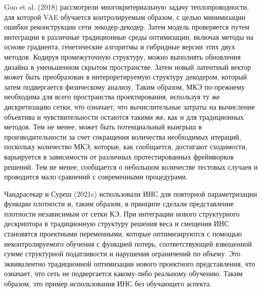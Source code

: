Guo et al. (2018) рассмотрели многокритериальную задачу теплопроводности, для которой VAE обучается контролируемым образом, с целью минимизации ошибки реконструкции сети энкодер-декодер. Затем модель проверяется путем интеграции в различные традиционные среды оптимизации, включая методы на основе градиента, генетические алгоритмы и гибридные версии этих двух методов. Кодируя промежуточную структуру, можно выполнять обновления дизайна в уменьшенном скрытом пространстве. Затем новый латентный вектор может быть преобразован в интерпретируемую структуру декодером, который затем подвергается физическому анализу. Таким образом, МКЭ по-прежнему необходима для всего пространства проектирования, используя ту же дискретизацию сетки, что означает, что вычислительные затраты на вычисление объектива и чувствительности остаются такими же, как и для традиционных методов. Тем не менее, может быть потенциальный выигрыш в производительности за счет сокращения количества необходимых итераций, поскольку количество МКЭ, которые, как сообщается, достигают сходимости, варьируется в зависимости от различных протестированных фреймворков решений. Тем не менее, сообщается о небольшом количестве тестовых случаев и проводится мало сравнений с современными процедурами.

Чандрасекар и Суреш (2021c) использовали ИНС для повторной параметризации функции плотности и, таким образом, в принципе сделали представление плотности независимым от сетки КЭ. При интеграции нового структурного дескриптора в традиционную структуру решения веса и смещения ИНС становятся проектными переменными, которые оптимизируются с помощью неконтролируемого обучения с функцией потерь, соответствующей взвешенной сумме структурной податливости и нарушения ограничений по объему. Это эквивалентно традиционной оптимизации нового проектного представления, что означает, что сеть не подвергается какому-либо реальному обучению. Таким образом, это пример использования ИНС без обучающего аспекта.


